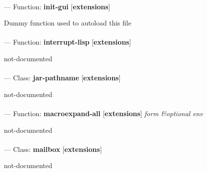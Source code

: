 \paragraph{}
\label{EXTENSIONS:INIT-GUI}
--- Function: \textbf{init-gui} [\textbf{extensions}] \textit{}

\begin{adjustwidth}{5em}{5em}
Dummy function used to autoload this file
\end{adjustwidth}

\paragraph{}
\label{EXTENSIONS:INTERRUPT-LISP}
--- Function: \textbf{interrupt-lisp} [\textbf{extensions}] \textit{}

\begin{adjustwidth}{5em}{5em}
not-documented
\end{adjustwidth}

\paragraph{}
\label{EXTENSIONS:JAR-PATHNAME}
--- Class: \textbf{jar-pathname} [\textbf{extensions}] \textit{}

\begin{adjustwidth}{5em}{5em}
not-documented
\end{adjustwidth}

\paragraph{}
\label{EXTENSIONS:MACROEXPAND-ALL}
--- Function: \textbf{macroexpand-all} [\textbf{extensions}] \textit{form \&optional env}

\begin{adjustwidth}{5em}{5em}
not-documented
\end{adjustwidth}

\paragraph{}
\label{EXTENSIONS:MAILBOX}
--- Class: \textbf{mailbox} [\textbf{extensions}] \textit{}

\begin{adjustwidth}{5em}{5em}
not-documented
\end{adjustwidth}

